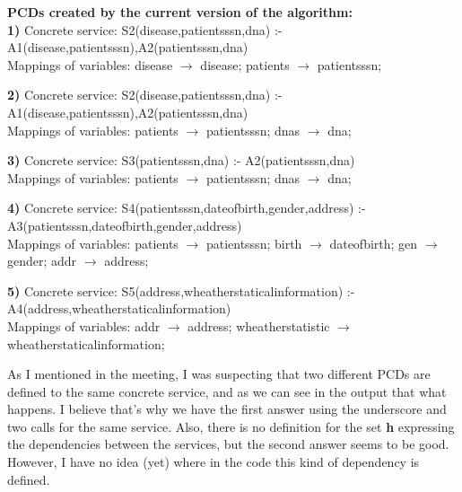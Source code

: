 \documentclass[12pt,a4paper,oneside]{report}
\begin{document}
\begin{flushleft}
\textbf{PCDs created by the current version of the algorithm:} \\
\textbf{1) }Concrete service: S2(disease,patientsssn,dna) :- A1(disease,patientsssn),A2(patientsssn,dna)\\
Mappings of variables: disease $\longrightarrow$ disease; patients $\longrightarrow$ patientsssn; 

\textbf{2) }Concrete service: S2(disease,patientsssn,dna) :- A1(disease,patientsssn),A2(patientsssn,dna)\\
Mappings of variables: patients $\longrightarrow$ patientsssn; dnas $\longrightarrow$ dna; 

\textbf{3) }Concrete service: S3(patientsssn,dna) :- A2(patientsssn,dna)\\
Mappings of variables: patients $\longrightarrow$ patientsssn; dnas $\longrightarrow$ dna; 

\textbf{4) }Concrete service: S4(patientsssn,dateofbirth,gender,address) :- A3(patientsssn,dateofbirth,gender,address)\\
Mappings of variables: patients $\longrightarrow$ patientsssn; birth $\longrightarrow$ dateofbirth; gen $\longrightarrow$ gender; addr $\longrightarrow$ address; 

\textbf{5) }Concrete service: S5(address,wheatherstaticalinformation) :- A4(address,wheatherstaticalinformation)\\
Mappings of variables: addr $\longrightarrow$ address; wheatherstatistic $\longrightarrow$ wheatherstaticalinformation; 
\end{flushleft}

As I mentioned in the meeting, I was suspecting that two different PCDs are defined to the same concrete service, and as we can see in the output that what happens. I believe that's why we have the first answer using the underscore and two calls for the same service. Also, there is no definition for the set \textbf{h} expressing the dependencies between the services,  but the second answer seems to be good. However, I have no idea (yet) where in the code this kind of dependency is defined.
\end{document}

